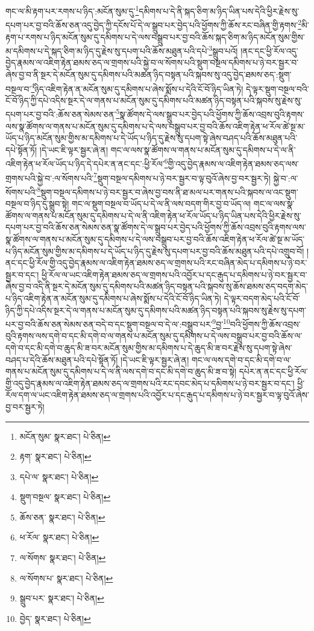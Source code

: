 གང་ལ་མི་རྟག་པར་རགས་པ་ཉིད་:མངོན་སུམ་དུ་\footnote{མངོན་སུམ་  སྣར་ཐང་།  པེ་ཅིན། }དམིགས་པ་དེ་ནི་སྐད་ཅིག་མ་ཉིད་ཡིན་པས་དེའི་ཕྱིར་རྗེས་སུ་དཔག་པར་བྱ་བའི་ཆོས་ཅན་འདུ་བྱེད་ཀྱི་དངོས་པོ་དེ་ལ་སྒྲུབ་པར་བྱེད་པའི་ཕྱོགས་ཀྱི་ཆོས་རང་བཞིན་གྱི་རྟགས་\footnote{རྟག་  སྣར་ཐང་།  པེ་ཅིན། }མི་རྟག་པ་རགས་པ་ཉིད་མངོན་སུམ་དུ་དམིགས་པ་དེ་ལས་བསྒྲུབ་པར་བྱ་བའི་ཆོས་སྐད་ཅིག་མ་ཉིད་མངོན་སུམ་གྱིས་མ་དམིགས་པ་དེ་སྐད་ཅིག་མ་ཉིད་དུ་རྗེས་སུ་དཔག་པའི་ཆོས་མཐུན་པའི་དཔེ་\footnote{དཔེ་ལ་  སྣར་ཐང་།  པེ་ཅིན། }སྒྲུབ་པའོ། །ནང་དང་ཕྱི་རོལ་འདུ་བྱེད་རྣམས་ལ་འཇིག་རྟེན་ཐམས་ཅད་ལ་གྲགས་པའི་སྐྱེ་བ་ལ་སོགས་པའི་སྡུག་བསྔལ་དམིགས་པ་ཉེ་བར་སྦྱར་བ་ཞེས་བྱ་བ་ནི་སྔར་དེ་མངོན་སུམ་དུ་དམིགས་པའི་མཚན་ཉིད་བསྟན་པའི་སྐབས་སུ་འདུ་བྱེད་ཐམས་ཅད་:སྡུག་བསྔལ་བ་\footnote{སྡུག་བསྔལ་  སྣར་ཐང་།  པེ་ཅིན། }ཉིད་འཇིག་རྟེན་ན་མངོན་སུམ་དུ་དམིགས་པ་ཞེས་སྨོས་པ་དེའི་ངོ་བོ་ཉིད་ཡིན་ཏེ། དེ་ལྟར་སྡུག་བསྔལ་བའི་ངོ་བོ་ཉིད་ཀྱི་དཔེ་འདིས་སྔར་དེ་ལ་གནས་པ་མངོན་སུམ་དུ་དམིགས་པའི་མཚན་ཉིད་བསྟན་པའི་སྐབས་སུ་རྗེས་སུ་དཔག་པར་བྱ་བའི་:ཆོས་ཅན་སེམས་ཅན་\footnote{ཆོས་ཅན་  སྣར་ཐང་།  པེ་ཅིན། }སྣ་ཚོགས་དེ་ལས་སྒྲུབ་པར་བྱེད་པའི་ཕྱོགས་ཀྱི་ཆོས་འབྲས་བུའི་རྟགས་ལས་སྣ་ཚོགས་ལ་གནས་པ་མངོན་སུམ་དུ་དམིགས་པ་དེ་ལས་བསྒྲུབ་པར་བྱ་བའི་ཆོས་འཇིག་རྟེན་ཕ་རོལ་ཚེ་སྔ་མ་ཡོད་པ་ཉིད་མངོན་སུམ་གྱིས་མ་དམིགས་པ་དེ་ཡོད་པ་ཉིད་དུ་རྗེས་སུ་དཔག་སྟེ་ཞེས་བཤད་པའི་ཆོས་མཐུན་པའི་དཔེ་སྟོན་ཏོ། །དེ་ཡང་ཇི་ལྟར་སྦྱར་ཞེ་ན། གང་ལ་ལས་སྣ་ཚོགས་ལ་གནས་པ་མངོན་སུམ་དུ་དམིགས་པ་དེ་ལ་ནི་འཇིག་རྟེན་ཕ་རོལ་ཡོད་པ་ཉིད་དེ་དཔེར་ན་ནང་དང་:ཕྱི་རོལ་\footnote{ཕ་རོལ་  སྣར་ཐང་།  པེ་ཅིན། }གྱི་འདུ་བྱེད་རྣམས་ལ་འཇིག་རྟེན་ཐམས་ཅད་ལས་གྲགས་པའི་སྐྱེ་བ་:ལ་སོགས་པའི་\footnote{ལ་སོགས་  སྣར་ཐང་།  པེ་ཅིན། }སྡུག་བསྔལ་དམིགས་པ་ཉེ་བར་སྦྱར་བ་ལྟ་བུའོ་ཞེས་བྱ་བར་སྦྱར་ཏེ། སྐྱེ་བ་:ལ་སོགས་པའི་\footnote{ལ་སོགས་པ་  སྣར་ཐང་།  པེ་ཅིན། }སྡུག་བསྔལ་དམིགས་པ་ཉེ་བར་སྦྱར་བ་ཞེས་བྱ་བས་ནི་ཐ་མལ་པར་གནས་པའི་སྐབས་ལ་འང་སྡུག་བསྔལ་བ་ཉིད་དུ་སྒྲུབ་སྟེ། གང་ལ་སྡུག་བསྔལ་བ་ཡོད་པ་དེ་ལ་ནི་ལས་བདག་གིར་བྱ་བ་ཡོད་ལ། གང་ལ་ལས་སྣ་ཚོགས་ལ་གནས་པ་མངོན་སུམ་དུ་དམིགས་པ་དེ་ལ་ནི་འཇིག་རྟེན་ཕ་རོལ་ཡོད་པ་ཉིད་ཡིན་པས་དེའི་ཕྱིར་རྗེས་སུ་དཔག་པར་བྱ་བའི་ཆོས་ཅན་སེམས་ཅན་སྣ་ཚོགས་དེ་ལ་སྒྲུབ་པར་བྱེད་པའི་ཕྱོགས་ཀྱི་ཆོས་འབྲས་བུའི་རྟགས་ལས་སྣ་ཚོགས་ལ་གནས་པ་མངོན་སུམ་དུ་དམིགས་པ་དེ་ལས་བསྒྲུབ་པར་བྱ་བའི་ཆོས་འཇིག་རྟེན་ཕ་རོལ་ཚེ་སྔ་མ་ཡོད་པ་ཉིད་མངོན་སུམ་གྱིས་མ་དམིགས་པ་དེ་ཡོད་པ་ཉིད་དུ་རྗེས་སུ་དཔག་པར་བྱ་བའི་ཆོས་མཐུན་པའི་དཔེ་འགྲུབ་བོ། །ནང་དང་ཕྱི་རོལ་གྱི་འདུ་བྱེད་རྣམས་ལ་འཇིག་རྟེན་ཐམས་ཅད་ལ་གྲགས་པའི་རང་བཞིན་མེད་པ་དམིགས་པ་ཉེ་བར་སྦྱར་བ་དང་། ཕྱི་རོལ་ལ་ཡང་འཇིག་རྟེན་ཐམས་ཅད་ལ་གྲགས་པའི་འབྱོར་པ་དང་རྒུད་པ་དམིགས་པ་ཉེ་བར་སྦྱར་བ་ཞེས་བྱ་བ་འདི་ནི་སྔར་དེ་མངོན་སུམ་དུ་དམིགས་པའི་མཚན་ཉིད་བསྟན་པའི་སྐབས་སུ་ཆོས་ཐམས་ཅད་བདག་མེད་པ་ཉིད་འཇིག་རྟེན་ན་མངོན་སུམ་དུ་དམིགས་པ་ཞེས་སྨོས་པ་དེའི་ངོ་བོ་ཉིད་ཡིན་ཏེ། དེ་ལྟར་བདག་མེད་པའི་ངོ་བོ་ཉིད་ཀྱི་དཔེ་འདིས་སྔར་དེ་ལ་གནས་པ་མངོན་སུམ་དུ་དམིགས་པའི་མཚན་ཉིད་བསྟན་པའི་སྐབས་སུ་རྗེས་སུ་དཔག་པར་བྱ་བའི་ཆོས་ཅན་སེམས་ཅན་བདེ་བ་དང་སྡུག་བསྔལ་བ་དེ་ལ་:བསྒྲུབ་པར་\footnote{སྒྲུབ་པར་  སྣར་ཐང་།  པེ་ཅིན། }བྱ་\footnote{བྱེད་  སྣར་ཐང་།  པེ་ཅིན། }བའི་ཕྱོགས་ཀྱི་ཆོས་འབྲས་བུའི་རྟགས་ལས་དགེ་བ་དང་མི་དགེ་བ་ལ་གནས་པ་མངོན་སུམ་དུ་དམིགས་པ་དེ་ལས་བསྒྲུབ་པར་བྱ་བའི་ཆོས་ལ་དགེ་བ་དང་མི་དགེ་བ་ཆུད་མི་ཟ་བར་མངོན་སུམ་གྱིས་མ་དམིགས་པ་དེ་ཆུད་མི་ཟ་བར་རྗེས་སུ་དཔག་སྟེ་ཞེས་བཤད་པ་དེའི་ཆོས་མཐུན་པའི་དཔེ་སྟོན་ཏོ། །དེ་ཡང་ཇི་ལྟར་སྦྱར་ཞེ་ན། གང་ལ་ལས་དགེ་བ་དང་མི་དགེ་བ་ལ་གནས་པ་མངོན་སུམ་དུ་དམིགས་པ་དེ་ལ་ནི་ལས་དགེ་བ་དང་མི་དགེ་བ་ཆུད་མི་ཟ་བ་སྟེ། དཔེར་ན་ནང་དང་ཕྱི་རོལ་གྱི་འདུ་བྱེད་རྣམས་ལ་འཇིག་རྟེན་ཐམས་ཅད་ལ་གྲགས་པའི་རང་དབང་མེད་པ་དམིགས་པ་ཉེ་བར་སྦྱར་བ་དང་། ཕྱི་རོལ་དག་ལ་ཡང་འཇིག་རྟེན་ཐམས་ཅད་ལ་གྲགས་པའི་འབྱོར་པ་དང་རྒུད་པ་དམིགས་པ་ཉེ་བར་སྦྱར་བ་ལྟ་བུའོ་ཞེས་བྱ་བར་སྦྱར་ཏེ། 